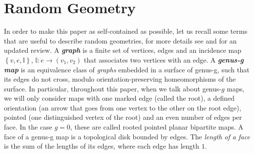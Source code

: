 \documentclass[a4paper,11pt]{article}
\newcommand{\mynote}[1]{{\textcolor{red}{[#1]}}}
\begin{document}
\section{Random Geometry}\label{section:Random_geometry}
In order to make this paper as self-contained as possible, let us recall some terms that are useful to describe random geometries, for more details see \cite{Eynard:2016yaa} and \cite{Budd:2022zry} for an updated review. A \textbf{\textit{graph}} is a finite set of vertices, edges and an incidence map  $\left\{ v,e,\mathbb{I}\right\} $, $\mathbb{I}:e\rightarrow (v_1,v_2)$ that associates two vertices with an edge. A \textbf{\textit{genus-g map}} is an equivalence class of \textit{graphs} embedded in a surface of genus-g, such that its edges do not cross, modulo orientation-preserving homeomorphisms of the surface.  In particular, throughout this paper, when we talk about genus-$g$ maps, we will only consider maps with one marked edge (called the root), a defined orientation (an arrow that goes from one vertex to the other on the root edge), pointed (one distinguished vertex of the root) and an even number of edges per face. In the case $g=0$, these are called rooted pointed planar bipartite maps. A face of a genus-g map is a topological disk bounded by edges. The \textit{length of a face} is the sum of the lengths of its edges, where each edge has length $1$.

\end{document}
